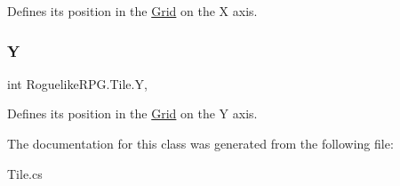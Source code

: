 Defines its position in the \mbox{\hyperlink{class_roguelike_r_p_g_1_1_grid}{Grid}} on the X axis. 

\mbox{\label{class_roguelike_r_p_g_1_1_tile_abc0553a51f38c39df5d62a6595b9552f}} 
\subsubsection{\texorpdfstring{Y}{Y}}
{\footnotesize\ttfamily int Roguelike\+R\+P\+G.\+Tile.\+Y\hspace{0.3cm}{\ttfamily [get]}, {\ttfamily [set]}}



Defines its position in the \mbox{\hyperlink{class_roguelike_r_p_g_1_1_grid}{Grid}} on the Y axis. 



The documentation for this class was generated from the following file\+:\begin{DoxyCompactItemize}
\item 
Tile.\+cs\end{DoxyCompactItemize}
